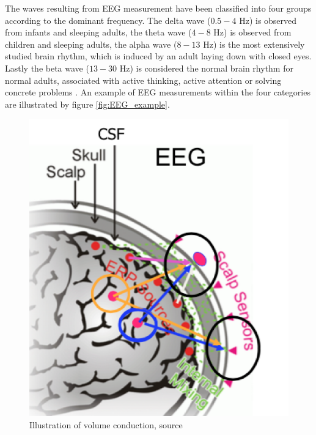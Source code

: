 The waves resulting from EEG measurement have been classified into four groups according to the dominant frequency. The delta wave ($0.5-4$ Hz) is observed from infants and sleeping adults, the theta wave ($4-8$ Hz) is observed from children and sleeping adults, the alpha wave ($8-13$ Hz) is the most extensively studied brain rhythm, which is induced by an adult laying down with closed eyes. Lastly the beta wave ($13-30$ Hz) is considered the normal brain rhythm for normal adults, associated with active thinking, active attention or solving concrete problems \cite[p. 11]{EEGsignalprocessing}. An example of EEG measurements within the four categories are illustrated 
by figure \ref{fig:EEG_example}.        
\begin{figure}[H]
    \begin{minipage}[t]{.45\textwidth}
        \centering
        \includegraphics[width=\textwidth]{figurs/scalp.png}
        \caption{Illustration of volume conduction, source \cite{phd2015}}\label{fig:volumeconduction}
    \end{minipage} 
    \hfill
    \begin{minipage}[t]{.45\textwidth}
        \centering

\end{minipage}
\end{figure}
